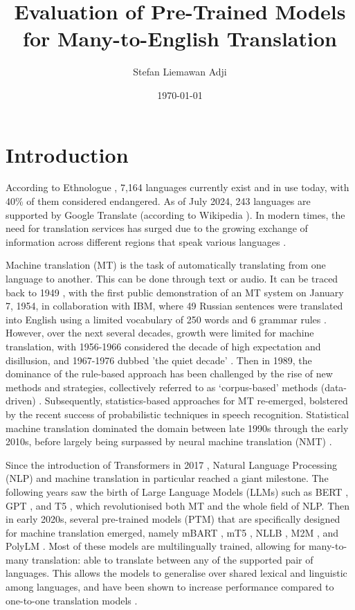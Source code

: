\documentclass[a4paper]{article}
\title{Evaluation of Pre-Trained Models for Many-to-English Translation}
\author{Stefan Liemawan Adji}
\date{\today}
\begin{document}
\maketitle

\section{Introduction}

According to Ethnologue \cite{ethnologue-2024}, 7,164 languages currently exist and in use today, with 40\% of them considered endangered. As of July 2024, 243 languages are supported by Google Translate (according to Wikipedia \cite{wikipedia-google-translate}). In modern times, the need for translation services has surged due to the growing exchange of information across different regions that speak various languages \cite{okpor-2014-machine-ta}.

Machine translation (MT) is the task of automatically translating from one language to another. This can be done through text or audio. It can be traced back to 1949 \cite{weaver-1999}, with the first public demonstration of an MT system on January 7, 1954, in collaboration with IBM, where 49 Russian sentences were translated into English using a limited vocabulary of 250 words and 6 grammar rules \cite{hutchins-2006-first-mt}. However, over the next several decades, growth were limited for machine translation, with 1956-1966 considered the decade of high expectation and disillusion, and 1967-1976 dubbed 'the quiet decade' \cite{hutchins-2001-mt-50-years}. Then in 1989, the dominance of the rule-based approach has been challenged by the rise of new methods and strategies, collectively referred to as ‘corpus-based’ methods (data-driven) \cite{hutchins-1994-research-methods-mt,hutchins-1998-development-mt}. Subsequently, statistics-based approaches for MT re-emerged, bolstered by the recent success of probabilistic techniques in speech recognition. Statistical machine translation \cite{lopez-2008-smt} dominated the domain between late 1990s through the early 2010s, before largely being surpassed by neural machine translation (NMT) \cite{cho-2014-properties,sutskever-2014-seq2seq}.

Since the introduction of Transformers in 2017 \cite{vaswani-2017-attention}, Natural Language Processing (NLP) and machine translation in particular reached a giant milestone. The following years saw the birth of Large Language Models (LLMs) such as BERT \cite{devlin-2019-bert}, GPT \cite{openai-2024-gpt4}, and T5 \cite{raffel-2023-t5}, which revolutionised both MT and the whole field of NLP. Then in early 2020s, several pre-trained models (PTM) that are specifically designed for machine translation emerged, namely mBART \cite{liu-2020-mbart}, mT5 \cite{xue-2021-mt5}, NLLB \cite{nllb200-2020}, M2M \cite{fan-2020-m2m100}, and PolyLM \cite{wei-2023-polylm}. Most of these models are multilingually trained, allowing for many-to-many translation: able to translate between any of the supported pair of languages. This allows the models to generalise over shared lexical and linguistic among languages, and have been shown to increase performance compared to one-to-one translation models \cite{liu-2020-mbart}.
\end{document}
